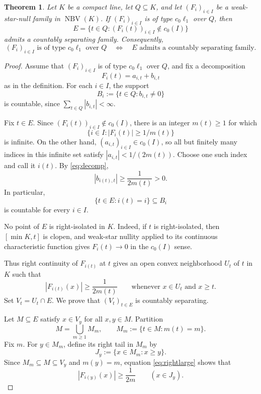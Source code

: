 \documentclass[11pt]{article}
\newtheorem{theorem}{Theorem}
\newcommand{\NBV}{\operatorname{NBV}}
\begin{document}
\begin{theorem}\label{thm:main}
Let $K$ be a compact line, let $Q\subseteq K$, and let $(F_i)_{i\in I}$ be a
weak-star-null family in $\NBV(K)$. If $(F_i)_{i\in I}$ is of type
$c_0\ell_1$ over $Q$, then
\[
 E=\{t\in Q:(F_i(t))_{i\in I}\notin c_0(I)\}
\]
admits a countably separating family. Consequently,
\[
 (F_i)_{i\in I}\text{ is of type }c_0\ell_1\text{ over }Q
 \quad\Longleftrightarrow\quad
 E\text{ admits a countably separating family}.
\]
\end{theorem}

\begin{proof}
Assume that $(F_i)_{i\in I}$ is of type $c_0\ell_1$ over $Q$, and fix a
decomposition
\begin{equation}\label{eq:decomp}
 F_i(t)=a_{i,t}+b_{i,t}
\end{equation}
as in the definition. For each $i\in I$, the support
\[
 B_i:=\{t\in Q:b_{i,t}\neq0\}
\]
is countable, since $\sum_{t\in Q}|b_{i,t}|<\infty$.

Fix $t\in E$. Since $(F_i(t))_{i\in I}\notin c_0(I)$, there is an integer
$m(t)\geq1$ for which
\[
 \{i\in I:|F_i(t)|\geq 1/m(t)\}
\]
is infinite. On the other hand, $(a_{i,t})_{i\in I}\in c_0(I)$, so all but
finitely many indices in this infinite set satisfy
$|a_{i,t}|<1/(2m(t))$. Choose one such index and call it $i(t)$. By
\eqref{eq:decomp},
\[
 |b_{i(t),t}|\geq\frac{1}{2m(t)}>0.
\]
In particular,
\begin{equation}\label{eq:fiber}
 \{t\in E:i(t)=i\}\subseteq B_i
\end{equation}
is countable for every $i\in I$.

No point of $E$ is right-isolated in $K$. Indeed, if $t$ is right-isolated,
then $[\min K,t]$ is clopen, and weak-star nullity applied to its continuous
characteristic function gives $F_i(t)\to0$ in the $c_0(I)$ sense.

Thus right continuity of $F_{i(t)}$ at $t$ gives an open convex neighborhood
$U_t$ of $t$ in $K$ such that
\begin{equation}\label{eq:rightlarge}
 |F_{i(t)}(x)|\geq\frac{1}{2m(t)}
 \qquad\text{whenever }x\in U_t\text{ and }x\geq t.
\end{equation}
Set $V_t=U_t\cap E$. We prove that $(V_t)_{t\in E}$ is countably
separating.

Let $M\subseteq E$ satisfy $x\in V_y$ for all $x,y\in M$. Partition
\[
 M=\bigcup_{m\geq1}M_m,
 \qquad M_m:=\{t\in M:m(t)=m\}.
\]
Fix $m$. For $y\in M_m$, define its right tail in $M_m$ by
\[
 J_y:=\{x\in M_m:x\geq y\}.
\]
Since $M_m\subseteq M\subseteq V_y$ and $m(y)=m$, equation
\eqref{eq:rightlarge} shows that
\begin{equation}\label{eq:tailhigh}
 |F_{i(y)}(x)|\geq\frac1{2m}\qquad(x\in J_y).
\end{equation}


\end{proof}
\end{document}
